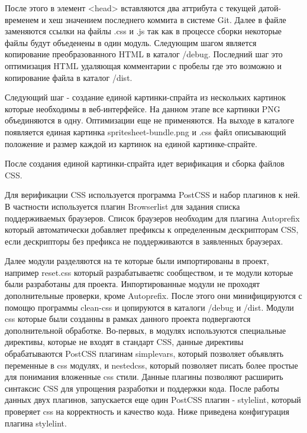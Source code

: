 После этого в элемент <head> вставляются два аттрибута с текущей датой-временем и хеш значением последнего коммита в системе Git. Далее в файле заменяются ссылки на файлы .css и .js так как в процессе сборки некоторые файлы будут объеденены в один модуль. Следующим шагом является копирование преобразованного HTML в каталог /debug. Последний шаг это оптимизация HTML удаляющая комментарии с пробелы где это возможно и копирование файла в каталог /dist. 

Следующий шаг - создание единой картинки-спрайта из нескольких картинок которые необходимы в веб-интерфейсе. На данном этапе все картинки PNG объединяются в одну. Оптимизации еще не применяются.
На выходе в каталоге появляется единая картинка spritesheet-bundle.png и .css файл описывающий положение и размер каждой из картинок на единой картинке-спрайте.

После создания единой картинки-спрайта идет верификация и сборка файлов CSS.  

Для верификации CSS используется программа PostCSS и набор плагинов к ней. В частности используется плагин Browserlist для задания списка поддерживаемых браузеров. Список браузеров необходим для плагина Autoprefix который автоматически добавляет префиксы к определенным дескрипторам CSS, если дескрипторы без префикса не поддерживаются в заявленных браузерах.

Далее модули разделяются на те которые были импортированы в проект, например reset.css который разрабатываетяс сообществом, и те модули которые были разработаны для проекта. Инпортированные модули не проходят дополнительные проверки, кроме Autoprefix. После этого они минифицируются с помощю программы clean-css и цопируются в каталоги /debug и /dist.
Модули css которые были созданны в рамках данного проекта подвергаются дополнительной обработке. Во-первых, в модулях используются специальные директивы, которые не входят в стандарт CSS, данные директивы обрабатываются PostCSS плагинам simplevars, который позволяет объявлять переменные в css модулях, и nestedcss, который позволяет писать более простые для понимания вложенные css стили. Данные плагины позволяют расширить синтаксис CSS для упрощения разработки и поддержки кода. После работы данных двух плагинов, запускается еще один PostCSS плагин - stylelint, который проверяет css на корректность и качество кода. Ниже приведена конфигурация плагина stylelint.

